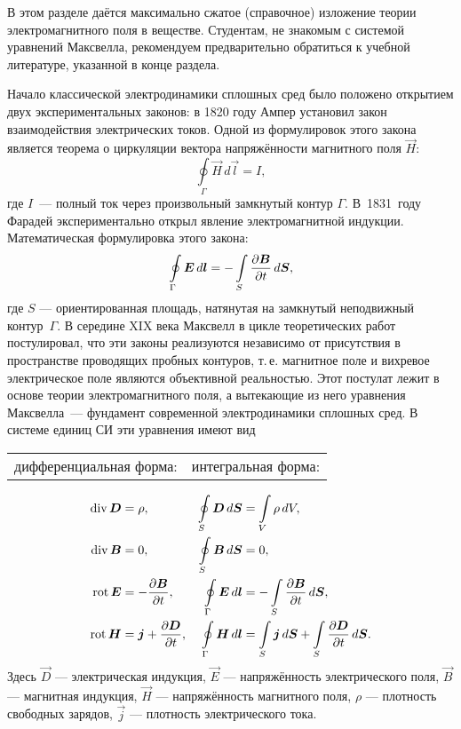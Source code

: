 \newcommand*{\ddt}[1]{\frac{\partial #1}{\partial t}}

В этом разделе даётся максимально сжатое (справочное)
изложение теории электромагнитного поля в веществе. Студентам, 
не знакомым с системой уравнений Максвелла, рекомендуем предварительно
обратиться к учебной литературе, указанной в конце раздела.


Начало классической электродинамики сплошных сред было положено открытием двух
экспериментальных законов: в 1820 году Ампер установил закон взаимодействия 
электрических токов. Одной из формулировок этого закона является теорема 
о циркуляции вектора напряжённости магнитного поля $\vec{H}$:
\[
\oint\limits_{\Gamma}\vec{H}\,d\vec{l}=I,
\]
где $I$~--- полный ток через произвольный замкнутый контур $\Gamma$. В~1831~году Фарадей 
экспериментально открыл явление электромагнитной индукции. Математическая 
формулировка этого закона:
\[
\oint\limits_{\Gamma}{\boldsymbol{E}}\,d{\boldsymbol{l}}=- 
\int\limits_S \frac{\partial {\boldsymbol{B}}}{\partial t}\, d{\boldsymbol{S}},
\]
где $S$ --- ориентированная площадь, натянутая на замкнутый неподвижный контур~$\Gamma$.
В середине XIX века Максвелл в цикле теоретических работ постулировал, 
что эти законы реализуются независимо 
от присутствия в пространстве проводящих пробных контуров, т.\,е. магнитное поле 
и вихревое электрическое поле являются объективной реальностью. 
Этот постулат лежит в основе теории электромагнитного поля, а вытекающие 
из него уравнения Максвелла~--- фундамент современной электродинамики сплошных сред. 
В системе единиц СИ эти уравнения имеют вид\par
\noindent\begin{tabular}{p{4.3cm}p{5cm}}
\small дифференциальная форма: & \small интегральная форма:
\end{tabular}
\begin{align}
\Div \vec{D} &= \rho,         & 
    \oint\limits_S \vec{D}\,d\vec{S} &= \int\limits_V\rho\, dV, \eqmark{1} \\
\Div \vec{B} &= 0,            & 
    \oint\limits_S \vec{B}\,d\vec{S} &= 0, \eqmark{2} \\
\Rot \vec{E} &= -\ddt{\vec{B}}, & 
    \oint\limits_{\Gamma} \vec{E}\,d\vec{l} & = 
           - \int\limits_S \ppd{\vec{B}}{t}\, d\vec{S}, \eqmark{3}\\
\Rot \vec{H} &= \vec{j} + \ddt{\vec{D}}, & 
    \oint\limits_{\Gamma} \vec{H}\,d\vec{l} &= \int\limits_S \vec{j}\,d\vec{S} + 
                  \int\limits_S \ppd{\vec{D}}{t}\, d\vec{S}. \eqmark{4}
\end{align}
Здесь $\vec{D}$ --- электрическая индукция, 
$\vec{E}$ --- напряжённость электрического поля, 
$\vec{B}$ --- магнитная индукция, $\vec{H}$ --- напряжённость магнитного поля,
$\rho$ --- плотность свободных зарядов, $\vec{j}$ --- плотность электрического тока.

